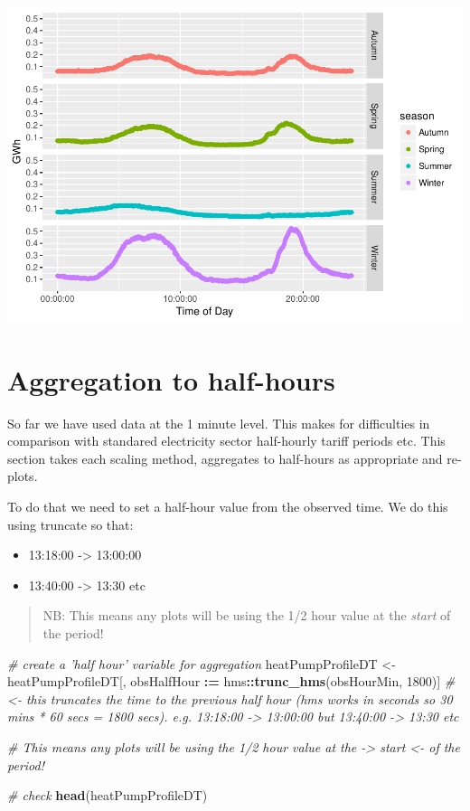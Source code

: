 \documentclass[]{article}
\newenvironment{Shaded}{\begin{snugshade}}{\end{snugshade}}
\newcommand{\KeywordTok}[1]{\textcolor[rgb]{0.13,0.29,0.53}{\textbf{#1}}}
\newcommand{\DecValTok}[1]{\textcolor[rgb]{0.00,0.00,0.81}{#1}}
\newcommand{\StringTok}[1]{\textcolor[rgb]{0.31,0.60,0.02}{#1}}
\newcommand{\CommentTok}[1]{\textcolor[rgb]{0.56,0.35,0.01}{\textit{#1}}}
\newcommand{\OperatorTok}[1]{\textcolor[rgb]{0.81,0.36,0.00}{\textbf{#1}}}
\newcommand{\ErrorTok}[1]{\textcolor[rgb]{0.64,0.00,0.00}{\textbf{#1}}}
\newcommand{\NormalTok}[1]{#1}
\providecommand{\tightlist}{%
  \setlength{\itemsep}{0pt}\setlength{\parskip}{0pt}}
\begin{document}
\includegraphics{heatPumpProfileAnalysis_files/figure-latex/new calc-1.pdf}

\section{Aggregation to half-hours}\label{aggregation-to-half-hours}

So far we have used data at the 1 minute level. This makes for
difficulties in comparison with standared electricity sector half-hourly
tariff periods etc. This section takes each scaling method, aggregates
to half-hours as appropriate and re-plots.

To do that we need to set a half-hour value from the observed time. We
do this using truncate so that:

\begin{itemize}
\tightlist
\item
  13:18:00 -\textgreater{} 13:00:00
\item
  13:40:00 -\textgreater{} 13:30 etc
\end{itemize}

\begin{quote}
NB: This means any plots will be using the 1/2 hour value at the
\emph{start} of the period!
\end{quote}

\begin{Shaded}
\begin{Highlighting}[]
\CommentTok{# create a 'half hour' variable for aggregation}
\NormalTok{heatPumpProfileDT <-}\StringTok{ }\NormalTok{heatPumpProfileDT[, obsHalfHour }\OperatorTok{:}\ErrorTok{=}\StringTok{ }\NormalTok{hms}\OperatorTok{::}\KeywordTok{trunc_hms}\NormalTok{(obsHourMin, }\DecValTok{1800}\NormalTok{)] }\CommentTok{# <- this truncates the time to the previous half hour (hms works in seconds so 30 mins * 60 secs = 1800 secs). e.g. 13:18:00 -> 13:00:00 but 13:40:00 -> 13:30 etc}

\CommentTok{# This means any plots will be using the 1/2 hour value at the  -> start <-  of the period!}

\CommentTok{# check}
\KeywordTok{head}\NormalTok{(heatPumpProfileDT)}
\end{Highlighting}
\end{Shaded}
\end{document}
